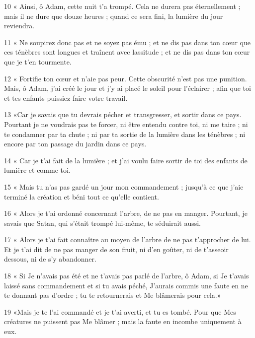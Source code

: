 \par 10 « Ainsi, ô Adam, cette nuit t'a trompé. Cela ne durera pas éternellement ; mais il ne dure que douze heures ; quand ce sera fini, la lumière du jour reviendra.

\par 11 « Ne soupirez donc pas et ne soyez pas ému ; et ne dis pas dans ton cœur que ces ténèbres sont longues et traînent avec lassitude ; et ne dis pas dans ton cœur que je t'en tourmente.

\par 12 « Fortifie ton cœur et n'aie pas peur. Cette obscurité n'est pas une punition. Mais, ô Adam, j'ai créé le jour et j'y ai placé le soleil pour l'éclairer ; afin que toi et tes enfants puissiez faire votre travail.

\par 13 «Car je savais que tu devrais pécher et transgresser, et sortir dans ce pays. Pourtant je ne voudrais pas te forcer, ni être entendu contre toi, ni me taire ; ni te condamner par ta chute ; ni par ta sortie de la lumière dans les ténèbres ; ni encore par ton passage du jardin dans ce pays.

\par 14 « Car je t'ai fait de la lumière ; et j’ai voulu faire sortir de toi des enfants de lumière et comme toi.

\par 15 « Mais tu n'as pas gardé un jour mon commandement ; jusqu'à ce que j'aie terminé la création et béni tout ce qu'elle contient.

\par 16 « Alors je t'ai ordonné concernant l'arbre, de ne pas en manger. Pourtant, je savais que Satan, qui s’était trompé lui-même, te séduirait aussi.

\par 17 « Alors je t'ai fait connaître au moyen de l'arbre de ne pas t'approcher de lui. Et je t'ai dit de ne pas manger de son fruit, ni d'en goûter, ni de t'asseoir dessous, ni de s'y abandonner.

\par 18 « Si Je n'avais pas été et ne t'avais pas parlé de l'arbre, ô Adam, si Je t'avais laissé sans commandement et si tu avais péché, J'aurais commis une faute en ne te donnant pas d'ordre ; tu te retournerais et Me blâmerais pour cela.»

\par 19 «Mais je te l'ai commandé et je t'ai averti, et tu es tombé. Pour que Mes créatures ne puissent pas Me blâmer ; mais la faute en incombe uniquement à eux.

